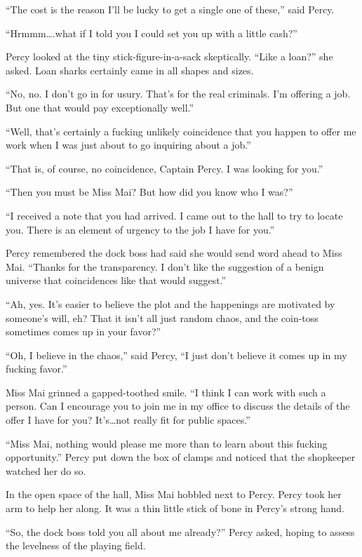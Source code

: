 \documentclass[
]{scrbook}
\begin{document}
``The cost is the reason I'll be lucky to get a single one of these,''
said Percy.

``Hrmmm\ldots.what if I told you I could set you up with a little
cash?''

Percy looked at the tiny stick-figure-in-a-sack skeptically. ``Like a
loan?'' she asked. Loan sharks certainly came in all shapes and sizes.

``No, no. I don't go in for usury. That's for the real criminals. I'm
offering a job. But one that would pay exceptionally well.''

``Well, that's certainly a fucking unlikely coincidence that you happen
to offer me work when I was just about to go inquiring about a job.''

``That is, of course, no coincidence, Captain Percy. I was looking for
you.''

``Then you must be Miss Mai? But how did you know who I was?''

``I received a note that you had arrived. I came out to the hall to try
to locate you. There is an element of urgency to the job I have for
you.''

Percy remembered the dock boss had said she would send word ahead to
Miss Mai. ``Thanks for the transparency. I don't like the suggestion of
a benign universe that coincidences like that would suggest.''

``Ah, yes. It's easier to believe the plot and the happenings are
motivated by someone's will, eh? That it isn't all just random chaos,
and the coin-toss sometimes comes up in your favor?''

``Oh, I believe in the chaos,'' said Percy, ``I just don't believe it
comes up in my fucking favor.''

Miss Mai grinned a gapped-toothed smile. ``I think I can work with such
a person. Can I encourage you to join me in my office to discuss the
details of the offer I have for you? It's\ldots not really fit for
public spaces.''

``Miss Mai, nothing would please me more than to learn about this
fucking opportunity.'' Percy put down the box of clamps and noticed that
the shopkeeper watched her do so.

\bigskip

In the open space of the hall, Miss Mai hobbled next to Percy. Percy
took her arm to help her along. It was a thin little stick of bone in
Percy's strong hand.

``So, the dock boss told you all about me already?'' Percy asked, hoping
to assess the levelness of the playing field.
\end{document}
